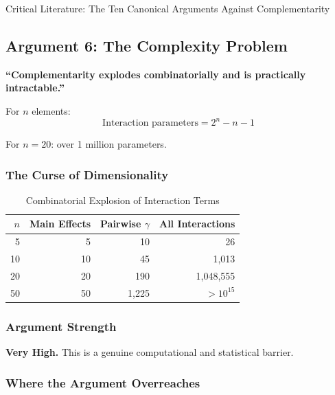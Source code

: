 \begin{chapter}{Critical Literature: The Ten Canonical Arguments Against Complementarity}
\subsection{Argument 6: The Complexity Problem}
\label{sec:arg-complexity}

\begin{tcolorbox}[colback=red!5!white,colframe=red!75!black,title=\textbf{Core Claim}]
\textbf{``Complementarity explodes combinatorially and is practically intractable.''}

For $n$ elements:
\[
\text{Interaction parameters} = 2^n - n - 1
\]

For $n = 20$: over 1 million parameters.
\end{tcolorbox}

\subsubsection{The Curse of Dimensionality}

\begin{table}[h]
\centering
\caption{Combinatorial Explosion of Interaction Terms}
\label{tab:combinatorial-explosion}
\renewcommand{\arraystretch}{1.2}
\begin{tabular}{@{}rrrr@{}}
\toprule
$n$ & Main Effects & Pairwise $\gamma$ & All Interactions \\
\midrule
5 & 5 & 10 & 26 \\
10 & 10 & 45 & 1,013 \\
20 & 20 & 190 & 1,048,555 \\
50 & 50 & 1,225 & $>10^{15}$ \\
\bottomrule
\end{tabular}
\end{table}

\subsubsection{Argument Strength}

\textbf{Very High.} This is a genuine computational and statistical barrier.

\subsubsection{Where the Argument Overreaches}


\end{chapter}
